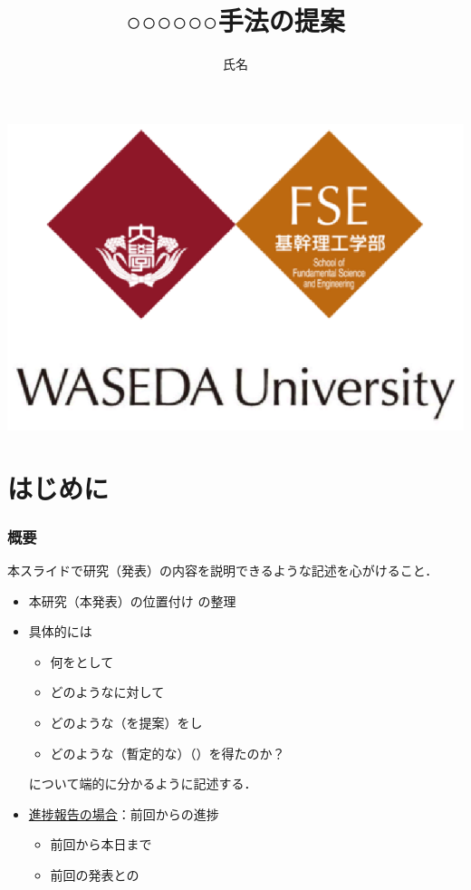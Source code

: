 \documentclass[dvipdfmx,cjk,t,10pt]{beamer}
\begin{document}
\title{○○○○○○手法の提案}

\author[shortname]{氏名}

\begin{frame}
\titlepage
	\begin{center}	
	\includegraphics[width=0.40\hsize]{waseda.eps}
	\end{center}	
	\vspace*{-0.5cm}
\end{frame}


\section{はじめに}

\begin{frame}
\frametitle{概要}

	\begin{screen}
		本スライドで研究（発表）の内容を説明できるような記述を心がけること．
	\end{screen}

	\begin{itemize}
	\item 本研究（本発表）の位置付け	の整理
	\itemspace	
	\item 具体的には
		\begin{itemize}
		\item 何をとして
		\item どのようなに対して
		\item どのような（を提案）をし
		\item どのような（暫定的な）（）を得たのか？
		\end{itemize}
		について端的に分かるように記述する．
	\itemspace
	\item \underline{進捗報告の場合}：前回からの進捗
		\begin{itemize}
		\item 前回から本日まで
		\item 前回の発表との
		\end{itemize}		
	\end{itemize}		
\end{frame}
\end{document}
